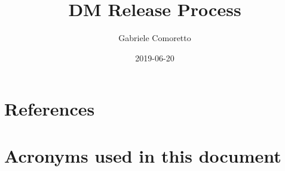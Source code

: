 \documentclass[DM,authoryear,toc]{lsstdoc}
\title{DM Release Process}
\author{%
Gabriele Comoretto
}
\date{2019-06-20}
\begin{document}
\setDocUpstreamVersion{\vcsrevision}

\maketitle


%
\newpage
\appendix





\newpage
\section{References} \label{sec:bib}



\section{Acronyms used in this document}\label{sec:acronyms}

\end{document}
